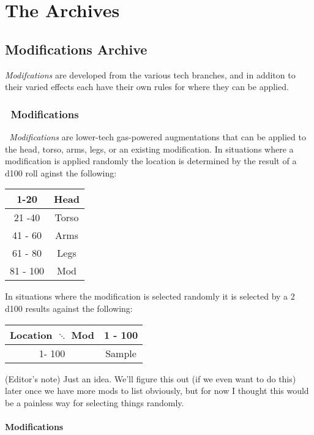 \part{The Archives}\label{part:archives}

\chapter{Modifications Archive}\label{ch:ref_enhance}
\emph{Modifcations} are developed from the various tech branches, and in additon to their varied effects each have their own rules for where they can be applied. 

\section{\dieselt\ Modifications}\label{sec:diesel_mods}
\emph{\dieselt\ Modifications} are lower-tech gas-powered augmentations that can be applied to the head, torso, arms, legs, or an existing modification. In situations where a modification is applied randomly the location is determined by the result of a d100 roll aginst the following:
\begin{center}
\begin{tabular}{c | c}
1-20 & Head \\
\hline
21 -40 & Torso \\
\hline
41 - 60 & Arms \\
\hline
61 - 80 & Legs \\
\hline
81 - 100 & Mod \\
\end{tabular}
\end{center}

In situations where the modification is selected randomly it is selected by a 2 d100 results against the following:
\begin{center}
\begin{tabular}{c | c}
Location $\ddots$ Mod & 1 - 100 \\
\hline
1- 100 & Sample
\end{tabular}
\end{center}
(Editor's note) Just an idea. We'll figure this out (if we even want to do this) later once we have more mods to list obviously, but for now I thought this would be a painless way for selecting things randomly.
\subsection*{Modifications}
\begin{multicols}{2}
\end{multicols}
\clearpage
